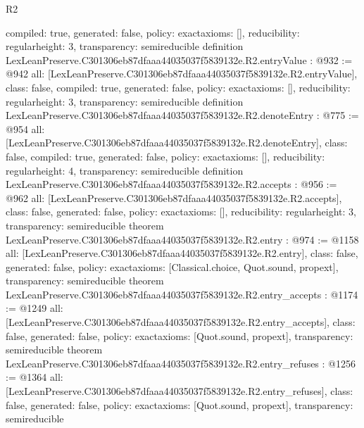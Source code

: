 \begin{lexlean}{R2}
\begin{coremodule}
{  compiled: true,
  generated: false,
  policy: exact{axioms: []},
  reducibility: regular{height: 3},
  transparency: semireducible
}
definition LexLeanPreserve.C301306eb87dfaaa44035037f5839132e.R2.entryValue : @932 := @942 {
  all: [LexLeanPreserve.C301306eb87dfaaa44035037f5839132e.R2.entryValue],
  class: false,
  compiled: true,
  generated: false,
  policy: exact{axioms: []},
  reducibility: regular{height: 3},
  transparency: semireducible
}
definition LexLeanPreserve.C301306eb87dfaaa44035037f5839132e.R2.denoteEntry : @775 := @954 {
  all: [LexLeanPreserve.C301306eb87dfaaa44035037f5839132e.R2.denoteEntry],
  class: false,
  compiled: true,
  generated: false,
  policy: exact{axioms: []},
  reducibility: regular{height: 4},
  transparency: semireducible
}
definition LexLeanPreserve.C301306eb87dfaaa44035037f5839132e.R2.accepts : @956 := @962 {
  all: [LexLeanPreserve.C301306eb87dfaaa44035037f5839132e.R2.accepts],
  class: false,
  generated: false,
  policy: exact{axioms: []},
  reducibility: regular{height: 3},
  transparency: semireducible
}
theorem LexLeanPreserve.C301306eb87dfaaa44035037f5839132e.R2.entry : @974 := @1158 {
  all: [LexLeanPreserve.C301306eb87dfaaa44035037f5839132e.R2.entry],
  class: false,
  generated: false,
  policy: exact{axioms: [Classical.choice, Quot.sound, propext]},
  transparency: semireducible
}
theorem LexLeanPreserve.C301306eb87dfaaa44035037f5839132e.R2.entry_accepts : @1174 := @1249 {
  all: [LexLeanPreserve.C301306eb87dfaaa44035037f5839132e.R2.entry_accepts],
  class: false,
  generated: false,
  policy: exact{axioms: [Quot.sound, propext]},
  transparency: semireducible
}
theorem LexLeanPreserve.C301306eb87dfaaa44035037f5839132e.R2.entry_refuses : @1256 := @1364 {
  all: [LexLeanPreserve.C301306eb87dfaaa44035037f5839132e.R2.entry_refuses],
  class: false,
  generated: false,
  policy: exact{axioms: [Quot.sound, propext]},
  transparency: semireducible
}


\end{coremodule}
\end{lexlean}
